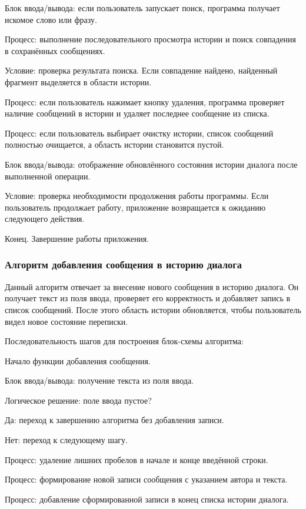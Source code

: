 \documentclass[12pt,a4paper]{article}
\begin{document}
Блок ввода/вывода: если пользователь запускает поиск, программа получает искомое слово или фразу.

Процесс: выполнение последовательного просмотра истории и поиск совпадения в сохранённых сообщениях.

Условие: проверка результата поиска. Если совпадение найдено, найденный фрагмент выделяется в области истории.

Процесс: если пользователь нажимает кнопку удаления, программа проверяет наличие сообщений в истории и удаляет последнее сообщение из списка.

Процесс: если пользователь выбирает очистку истории, список сообщений полностью очищается, а область истории становится пустой.

Блок ввода/вывода: отображение обновлённого состояния истории диалога после выполненной операции.

Условие: проверка необходимости продолжения работы программы. Если пользователь продолжает работу, приложение возвращается к ожиданию следующего действия.

Конец. Завершение работы приложения.

\subsubsection{Алгоритм добавления сообщения в историю диалога}

Данный алгоритм отвечает за внесение нового сообщения в историю диалога. Он получает текст из поля ввода, проверяет его корректность и добавляет запись в список сообщений. После этого область истории обновляется, чтобы пользователь видел новое состояние переписки.

Последовательность шагов для построения блок-схемы алгоритма:

Начало функции добавления сообщения.

Блок ввода/вывода: получение текста из поля ввода.

Логическое решение: поле ввода пустое?

Да: переход к завершению алгоритма без добавления записи.

Нет: переход к следующему шагу.

Процесс: удаление лишних пробелов в начале и конце введённой строки.

Процесс: формирование новой записи сообщения с указанием автора и текста.

Процесс: добавление сформированной записи в конец списка истории диалога.
\end{document}
